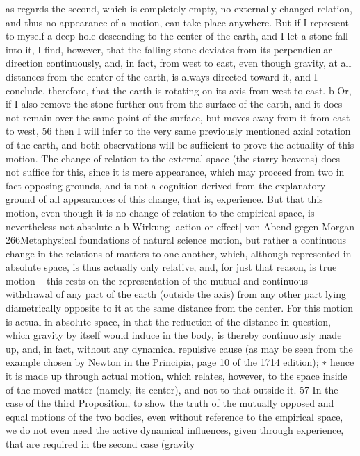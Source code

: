as regards the second, which is completely empty, no externally changed
relation, and thus no appearance of a motion, can take place anywhere.
But if I represent to myself a deep hole descending to the center of
the earth, and I let a stone fall into it, I ﬁnd, however, that the falling
stone deviates from its perpendicular direction continuously, and, in fact,
from west to east, even though gravity, at all distances from the center
of the earth, is always directed toward it, and I conclude, therefore, that
the earth is rotating on its axis from west to east. b Or, if I also remove the
stone further out from the surface of the earth, and it does not remain
over the same point of the surface, but moves away from it from east
to west, 56 then I will infer to the very same previously mentioned axial
rotation of the earth, and both observations will be sufﬁcient to prove
the actuality of this motion. The change of relation to the external space
(the starry heavens) does not sufﬁce for this, since it is mere appearance,
which may proceed from two in fact opposing grounds, and is not a
cognition derived from the explanatory ground of all appearances of
this change, that is, experience. But that this motion, even though it is
no change of relation to the empirical space, is nevertheless not absolute
a
b
Wirkung [action or effect]
von Abend gegen Morgan
266Metaphysical foundations of natural science
motion, but rather a continuous change in the relations of matters to one
another, which, although represented in absolute space, is thus actually
only relative, and, for just that reason, is true motion – this rests on
the representation of the mutual and continuous withdrawal of any part
of the earth (outside the axis) from any other part lying diametrically
opposite to it at the same distance from the center. For this motion is
actual in absolute space, in that the reduction of the distance in question,
which gravity by itself would induce in the body, is thereby continuously
made up, and, in fact, without any dynamical repulsive cause (as may be
seen from the example chosen by Newton in the Principia, page 10 of
the 1714 edition); ∗ hence it is made up through actual motion, which
relates, however, to the space inside of the moved matter (namely, its
center), and not to that outside it. 57
In the case of the third Proposition, to show the truth of the mutually
opposed and equal motions of the two bodies, even without reference to
the empirical space, we do not even need the active dynamical inﬂuences,
given through experience, that are required in the second case (gravity

